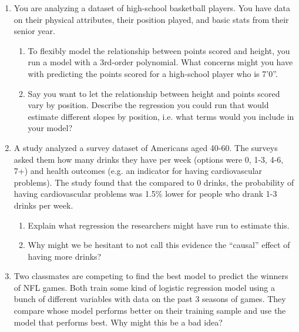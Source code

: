 \documentclass[12pt]{article}
\begin{document}
\begin{enumerate}
  \newpage
  \item You are analyzing a dataset of high-school basketball players. You have data on their physical attributes, their position played, and basic stats from their senior year.
  \begin{enumerate}
    \item To flexibly model the relationship between points scored and height, you run a model with a 3rd-order polynomial. What concerns might you have with predicting the points scored for a high-school player who is 7'0''.


    \item Say you want to let the relationship between height and points scored vary by position. Describe the regression you could run that would estimate different slopes by position, i.e. what terms would you include in your model?
  \end{enumerate}

  \bigskip
  \item A study analyzed a survey dataset of Americans aged 40-60. The surveys asked them how many drinks they have per week (options were 0, 1-3, 4-6, 7+) and health outcomes (e.g. an indicator for having cardiovascular problems).
  The study found that the compared to 0 drinks, the probability of having cardiovascular problems was 1.5\% lower for people who drank 1-3 drinks per week.
  \begin{enumerate}
    \item Explain what regression the researchers might have run to estimate this.

    \item Why might we be hesitant to not call this evidence the ``causal'' effect of having more drinks?
  \end{enumerate}


  \bigskip
  \item Two classmates are competing to find the best model to predict the winners of NFL games. Both train some kind of logistic regression model using a bunch of different variables with data on the past 3 seasons of games. They compare whose model performs better on their training sample and use the model that performs best. Why might this be a bad idea?


\end{enumerate}
\end{document}
